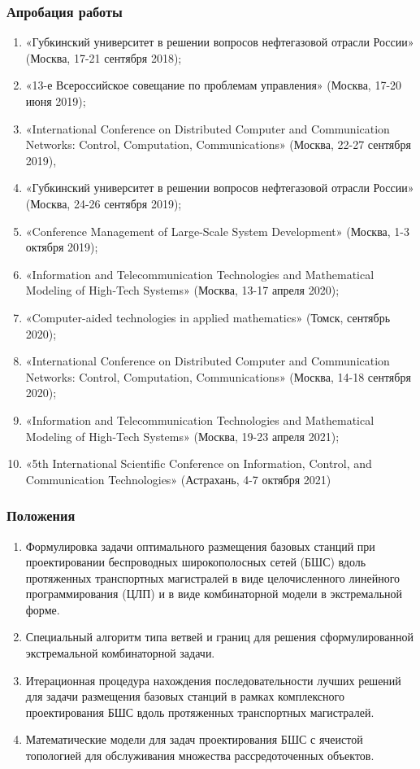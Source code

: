 \begin{frame}
    \frametitle{Апробация работы}
    \begin{enumerate} %
        \fontsize{8pt}{7.2}\selectfont
        \item «Губкинский университет в решении вопросов нефтегазовой отрасли России» (Москва, 17-21 сентября 2018); 
        \item «13-е Всероссийское совещание по проблемам управления» (Москва, 17-20 июня 2019); 
        \item «International Conference on Distributed Computer and Communication Networks: Control, Computation, Communications» (Москва, 22-27 сентября 2019), 
        \item «Губкинский университет в решении вопросов нефтегазовой отрасли России» (Москва, 24-26 сентября 2019); 
        \item «Conference Management of Large-Scale System Development» (Москва, 1-3 октября 2019); 
        \item «Information and Telecommunication Technologies and Mathematical Modeling of High-Tech Systems» (Москва, 13-17 апреля 2020); 
        \item «Computer-aided technologies in applied mathematics» (Томск, сентябрь 2020);
        \item «International Conference on Distributed Computer and Communication Networks: Control, Computation, Communications» (Москва, 14-18 сентября 2020); 
        \item «Information and Telecommunication Technologies and Mathematical Modeling of High-Tech Systems» (Москва, 19-23 апреля 2021);
        \item «5th International Scientific Conference on Information, Control, and Communication Technologies» (Астрахань, 4-7 октября 2021)
      \end{enumerate}
\end{frame}

\begin{frame}
    \frametitle{Положения}
    \begin{enumerate} %
        \item Формулировка задачи оптимального размещения базовых станций при проектировании беспроводных широкополосных сетей (БШС) вдоль протяженных транспортных магистралей в виде целочисленного линейного программирования (ЦЛП) и в виде комбинаторной модели в экстремальной форме.
   
        \item Специальный алгоритм типа ветвей и границ для решения сформулированной экстремальной комбинаторной задачи.
        \item Итерационная процедура нахождения последовательности лучших решений для задачи размещения базовых станций в рамках комплексного проектирования БШС вдоль протяженных транспортных магистралей.
        \item Математические модели для задач проектирования БШС с ячеистой топологией для обслуживания множества рассредоточенных объектов.
      \end{enumerate}
\end{frame}


